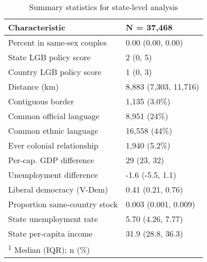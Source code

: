 \documentclass[
  11pt,
]{article}
\begin{document}
\begin{table}[!h]

\caption{\label{tab:desc-table-state}Summary statistics for state-level analysis}
\centering
\fontsize{8}{10}\selectfont
\begin{tabular}[t]{ll}
\toprule
Characteristic & N = 37,468\\
\midrule
Percent in same-sex couples & 0.00 (0.00, 0.00)\\
State LGB policy score & 2 (0, 5)\\
Country LGB policy score & 1 (0, 3)\\
Distance (km) & 8,883 (7,303, 11,716)\\
Contiguous border & 1,135 (3.0\%)\\
\addlinespace
Common official language & 8,951 (24\%)\\
Common ethnic language & 16,558 (44\%)\\
Ever colonial relationship & 1,940 (5.2\%)\\
Per-cap. GDP difference & 29 (23, 32)\\
Unemployment difference & -1.6 (-5.5, 1.1)\\
\addlinespace
Liberal democracy (V-Dem) & 0.41 (0.21, 0.76)\\
Proportion same-country stock & 0.003 (0.001, 0.009)\\
State unemployment rate & 5.70 (4.26, 7.77)\\
State per-capita income & 31.9 (28.8, 36.3)\\
\bottomrule
\multicolumn{2}{l}{\rule{0pt}{1em}\textsuperscript{1} Median (IQR); n (\%)}\\
\end{tabular}
\end{table}
\end{document}
